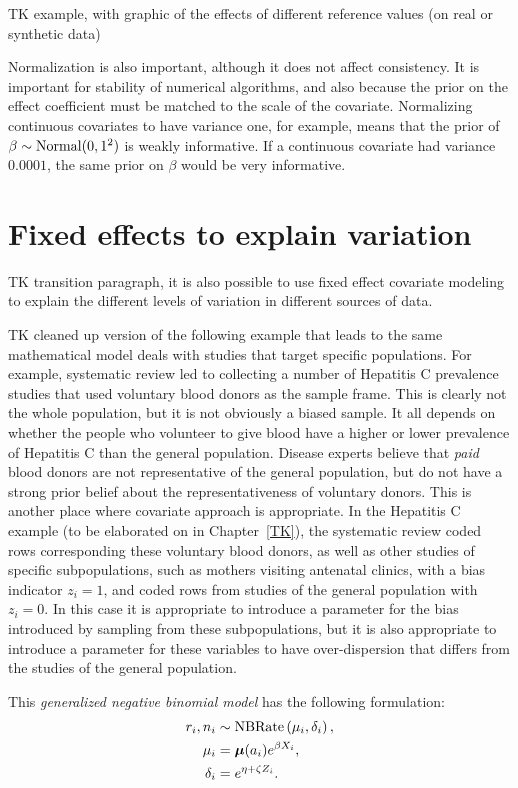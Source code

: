 TK example, with graphic of the effects of different reference values
(on real or synthetic data)

Normalization is also important, although it does not affect
consistency.  It is important for stability of numerical algorithms,
and also because the prior on the effect coefficient must be matched
to the scale of the covariate.  Normalizing continuous covariates to
have variance one, for example, means that the prior of
$\beta\sim\operatorname{Normal}(0,1^2)$ is weakly informative.  If a continuous
covariate had variance $0.0001$, the same prior on $\beta$ would be
very informative.

\section{Fixed effects to explain variation}
TK transition paragraph, it is also possible to use fixed effect
covariate modeling to explain the different levels of variation in
different sources of data.

TK cleaned up version of the following example that leads to the same
mathematical model deals with studies that target specific
populations.  For example, systematic review led to collecting a
number of Hepatitis C prevalence studies that used voluntary blood
donors as the sample frame.  This is clearly not the whole population,
but it is not obviously a biased sample.  It all depends on whether
the people who volunteer to give blood have a higher or lower
prevalence of Hepatitis C than the general population. Disease experts
believe that \emph{paid} blood donors are not representative of the
general population, but do not have a strong prior belief about the
representativeness of voluntary donors.  This is another place where
covariate approach is appropriate. In the Hepatitis C example (to be
elaborated on in Chapter~\ref{TK}), the systematic review coded rows
corresponding these voluntary blood donors, as well as other studies
of specific subpopulations, such as mothers visiting antenatal
clinics, with a bias indicator $z_i = 1$, and coded rows from studies
of the general population with $z_i = 0$.  In this case it is
appropriate to introduce a parameter for the bias introduced by
sampling from these subpopulations, but it is also appropriate to
introduce a parameter for these variables to have over-dispersion that
differs from the studies of the general population.

This \emph{generalized negative binomial model} has the following
formulation:
\begin{align*}
r_i, n_i &\sim \operatorname{NBRate}\left(\mu_i, \delta_i\right),\\
\mu_i &= \boldsymbol{\mu}(a_i)e^{\beta X_i},\\
\delta_i &= e^{\eta + \zeta Z_i}.
\end{align*}

